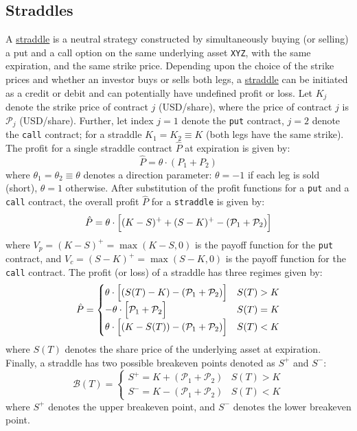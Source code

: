 \documentclass[11pt]{article}
\theoremstyle{definition}
\begin{document}
\subsection*{Straddles}
A \href{https://www.investopedia.com/terms/s/straddle.asp}{straddle} is a neutral strategy constructed by simultaneously buying (or selling) 
a put and a call option on the same underlying asset \texttt{XYZ}, with the same expiration, and the same strike price. 
Depending upon the choice of the strike prices and whether an investor buys or sells both legs, 
a \href{https://www.investopedia.com/terms/s/straddle.asp}{straddle} can be initiated as a credit or debit and can potentially have undefined profit or loss.
Let $K_{j}$ denote the strike price of contract $j$ (USD/share), where the price of contract $j$ is $\mathcal{P}_{j}$ (USD/share). 
Further, let index $j=1$ denote the \texttt{put} contract, $j=2$ denote the \texttt{call} contract; 
for a straddle $K_{1}= K_{2}\equiv{K}$ (both legs have the same strike). The profit for a single straddle contract $\hat{P}$ at expiration is given by:
\begin{equation}
\hat{P} = \theta\cdot\left(P_{1}+P_{2}\right)
\end{equation}
where $\theta_{1}=\theta_{2}\equiv\theta$ denotes a direction parameter: $\theta=-1$ if each leg is sold (short),
$\theta=1$ otherwise. After substitution of the profit functions for a \texttt{put} and a \texttt{call} contract, the overall profit $\hat{P}$ for a \texttt{straddle} 
is given by:
\begin{equation}
\hat{P} = \theta\cdot\Bigl[(K-S)^{+}+(S-K)^{+}-(\mathcal{P}_{1}+\mathcal{P}_{2})\Bigr]
\end{equation}
where $V_{p} = (K-S)^{+}=\max(K-S,0)$ is the payoff function for the \texttt{put} contract, and $V_{c} = (S-K)^{+} = \max(S-K,0)$ is the payoff function for the \texttt{call} contract. 
The profit (or loss) of a straddle has three regimes given by:
\begin{equation}
\hat{P} = \begin{cases}
  \theta\cdot\Bigl[(S(T)-K)-\left(\mathcal{P}_{1}+\mathcal{P}_{2}\right)\Bigr]  & S(T)>K \\
  -\theta\cdot\Bigl[\mathcal{P}_{1}+\mathcal{P}_{2}\Bigr] & S(T)=K \\
    \theta\cdot\Bigl[(K-S(T))-\left(\mathcal{P}_{1}+\mathcal{P}_{2}\right)\Bigr] & S(T)<K
\end{cases}
\end{equation}
where $S(T)$ denotes the share price of the underlying asset at expiration. Finally, a straddle has two possible breakeven points denoted as $S^{+}$ and $S^{-}$:
\begin{equation}
	\mathcal{B}(T) = \begin{cases}
		S^{+} = K + \left(\mathcal{P}_{1}+\mathcal{P}_{2}\right) & S(T)>K \\
		S^{-} = K - \left(\mathcal{P}_{1}+\mathcal{P}_{2}\right) & S(T)<K
	\end{cases}
\end{equation}
where $S^{+}$ denotes the upper breakeven point, and $S^{-}$ denotes the lower breakeven point.
\end{document}
